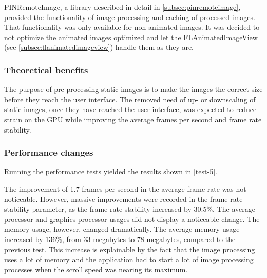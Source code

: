 \documentclass[a4paper,12pt]{article}
\begin{document}
PINRemoteImage, a library described in detail in \autoref{subsec:pinremoteimage}, provided the functionality of image processing and caching of processed images. That functionality was only available for non-animated images. It was decided to not optimize the animated images optimized and let the FLAnimatedImageView (see \autoref{subsec:flanimatedimageview}) handle them as they are.

\subsubsection{Theoretical benefits}
The purpose of pre-processing static images is to make the images the correct size before they reach the user interface. The removed need of up- or downscaling of static images, once they have reached the user interface, was expected to reduce strain on the GPU while improving the average frames per second and frame rate stability.

\subsubsection{Performance changes}
Running the performance tests yielded the results shown in \autoref{test-5}.

The improvement of 1.7 frames per second in the average frame rate was not noticeable. However, massive improvements were recorded in the frame rate stability parameter, as the frame rate stability increased by 30.5\%. The average processor and graphics processor usages did not display a noticeable change. The memory usage, however, changed dramatically. The average memory usage increased by 136\%, from 33 megabytes to 78 megabytes, compared to the previous test. This increase is explainable by the fact that the image processing uses a lot of memory and the application had to start a lot of image processing processes when the scroll speed was nearing its maximum.
\end{document}
